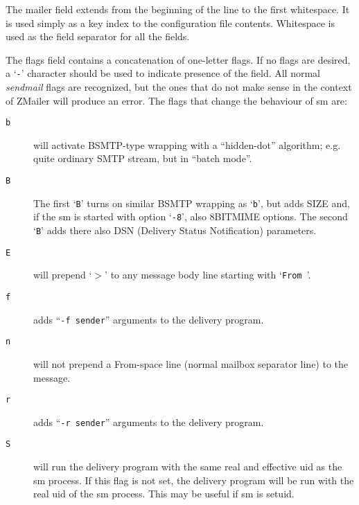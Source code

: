 The mailer field extends from the beginning of the line to
the first whitespace.  It is used simply as a key index to
the configuration  file  contents.  Whitespace is used as
the field separator for all the fields.

The flags field contains  a  concatenation  of  one-letter
flags.  If no flags are desired, a `{\tt -}' character should be
used to indicate presence of the field. All normal  {\em sendmail\/}  flags  are recognized, but the ones that do not make
sense in the context of ZMailer will  produce  an  error.
The flags that change the behaviour of sm are:

\begin{description}
\item[ {\tt b}] \mbox{}

will activate BSMTP-type wrapping with a ``hidden-dot''
algorithm; e.g. quite ordinary SMTP stream, but in ``batch mode''.



\item[ {\tt B}] \mbox{}

The  first `{\tt B}'  turns on similar BSMTP wrapping as
`{\tt b}', but adds SIZE and, if the sm is  started  with
option `{\tt -8}', also 8BITMIME options.  The second `{\tt B}'
adds there also DSN (Delivery Status  Notification) parameters.



\item[ {\tt E}] \mbox{}

will prepend `{\(>\)}' to any message body line starting
with `{\tt From }'.



\item[ {\tt f}] \mbox{}

adds ``{\tt -f sender}'' arguments to the delivery program.



\item[ {\tt n}] \mbox{}

will not prepend a From-space line (normal mailbox
separator line) to the message.



\item[ {\tt r}] \mbox{}

adds ``{\tt -r sender}'' arguments to the delivery program.



\item[ {\tt S}] \mbox{}

will run the delivery program with the same real
and effective uid as the sm process.  If this  flag
is  not  set, the delivery program will be run with
the real uid of the sm process. This may be useful if sm is setuid.



\end{description}
